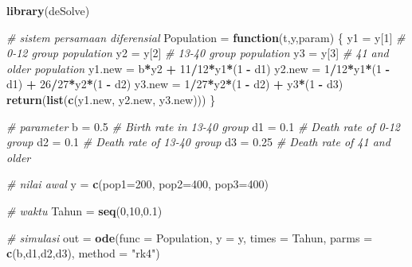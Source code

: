 \documentclass[]{book}
\newenvironment{Shaded}{\begin{snugshade}}{\end{snugshade}}
\newcommand{\CommentTok}[1]{\textcolor[rgb]{0.56,0.35,0.01}{\textit{#1}}}
\newcommand{\ControlFlowTok}[1]{\textcolor[rgb]{0.13,0.29,0.53}{\textbf{#1}}}
\newcommand{\DataTypeTok}[1]{\textcolor[rgb]{0.13,0.29,0.53}{#1}}
\newcommand{\DecValTok}[1]{\textcolor[rgb]{0.00,0.00,0.81}{#1}}
\newcommand{\FloatTok}[1]{\textcolor[rgb]{0.00,0.00,0.81}{#1}}
\newcommand{\KeywordTok}[1]{\textcolor[rgb]{0.13,0.29,0.53}{\textbf{#1}}}
\newcommand{\NormalTok}[1]{#1}
\newcommand{\OperatorTok}[1]{\textcolor[rgb]{0.81,0.36,0.00}{\textbf{#1}}}
\newcommand{\StringTok}[1]{\textcolor[rgb]{0.31,0.60,0.02}{#1}}
\theoremstyle{definition}
\theoremstyle{definition}
\theoremstyle{definition}
\theoremstyle{remark}
\begin{document}
\begin{Shaded}
\begin{Highlighting}[]
\KeywordTok{library}\NormalTok{(deSolve)}

\CommentTok{# sistem persamaan diferensial}
\NormalTok{Population =}\StringTok{ }\ControlFlowTok{function}\NormalTok{(t,y,param) \{}
\NormalTok{  y1 =}\StringTok{ }\NormalTok{y[}\DecValTok{1}\NormalTok{] }\CommentTok{# 0-12 group population}
\NormalTok{  y2 =}\StringTok{ }\NormalTok{y[}\DecValTok{2}\NormalTok{] }\CommentTok{# 13-40 group population}
\NormalTok{  y3 =}\StringTok{ }\NormalTok{y[}\DecValTok{3}\NormalTok{] }\CommentTok{# 41 and older population}
\NormalTok{  y1.new =}\StringTok{ }\NormalTok{b}\OperatorTok{*}\NormalTok{y2 }\OperatorTok{+}\StringTok{ }\DecValTok{11}\OperatorTok{/}\DecValTok{12}\OperatorTok{*}\NormalTok{y1}\OperatorTok{*}\NormalTok{(}\DecValTok{1} \OperatorTok{-}\StringTok{ }\NormalTok{d1)}
\NormalTok{  y2.new =}\StringTok{ }\DecValTok{1}\OperatorTok{/}\DecValTok{12}\OperatorTok{*}\NormalTok{y1}\OperatorTok{*}\NormalTok{(}\DecValTok{1} \OperatorTok{-}\StringTok{ }\NormalTok{d1) }\OperatorTok{+}\StringTok{ }\DecValTok{26}\OperatorTok{/}\DecValTok{27}\OperatorTok{*}\NormalTok{y2}\OperatorTok{*}\NormalTok{(}\DecValTok{1} \OperatorTok{-}\StringTok{ }\NormalTok{d2)}
\NormalTok{  y3.new =}\StringTok{ }\DecValTok{1}\OperatorTok{/}\DecValTok{27}\OperatorTok{*}\NormalTok{y2}\OperatorTok{*}\NormalTok{(}\DecValTok{1} \OperatorTok{-}\StringTok{ }\NormalTok{d2) }\OperatorTok{+}\StringTok{ }\NormalTok{y3}\OperatorTok{*}\NormalTok{(}\DecValTok{1} \OperatorTok{-}\StringTok{ }\NormalTok{d3)}
  \KeywordTok{return}\NormalTok{(}\KeywordTok{list}\NormalTok{(}\KeywordTok{c}\NormalTok{(y1.new, y2.new, y3.new)))}
\NormalTok{\}}

\CommentTok{# parameter}
\NormalTok{b =}\StringTok{ }\FloatTok{0.5} \CommentTok{# Birth rate in 13-40 group}
\NormalTok{d1 =}\StringTok{ }\FloatTok{0.1} \CommentTok{# Death rate of 0-12 group}
\NormalTok{d2 =}\StringTok{ }\FloatTok{0.1} \CommentTok{# Death rate of 13-40 group}
\NormalTok{d3 =}\StringTok{ }\FloatTok{0.25} \CommentTok{# Death rate of 41 and older}

\CommentTok{# nilai awal}
\NormalTok{y =}\StringTok{ }\KeywordTok{c}\NormalTok{(}\DataTypeTok{pop1=}\DecValTok{200}\NormalTok{, }\DataTypeTok{pop2=}\DecValTok{400}\NormalTok{, }\DataTypeTok{pop3=}\DecValTok{400}\NormalTok{)}

\CommentTok{# waktu}
\NormalTok{Tahun =}\StringTok{ }\KeywordTok{seq}\NormalTok{(}\DecValTok{0}\NormalTok{,}\DecValTok{10}\NormalTok{,}\FloatTok{0.1}\NormalTok{)}

\CommentTok{# simulasi}
\NormalTok{out =}\StringTok{ }\KeywordTok{ode}\NormalTok{(}\DataTypeTok{func =}\NormalTok{ Population, }\DataTypeTok{y =}\NormalTok{ y, }\DataTypeTok{times =}\NormalTok{ Tahun, }
          \DataTypeTok{parms =} \KeywordTok{c}\NormalTok{(b,d1,d2,d3), }\DataTypeTok{method =} \StringTok{"rk4"}\NormalTok{)}
\end{Highlighting}
\end{Shaded}
\end{document}
